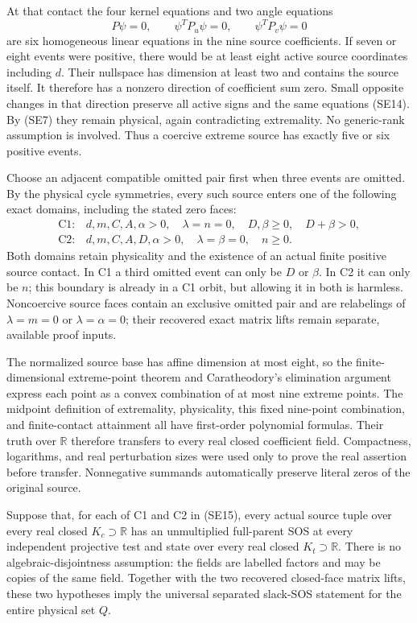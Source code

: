 At that contact the four kernel equations and two angle equations
\[
P\psi=0,\qquad \psi^TP_u\psi=0,\qquad\psi^TP_v\psi=0
\tag{SE14}
\]
are six homogeneous linear equations in the nine source coefficients.
If seven or eight events were positive, there would be at least eight
active source coordinates including $d$.  Their nullspace has dimension
at least two and contains the source itself.  It therefore has a
nonzero direction of coefficient sum zero.  Small opposite changes in
that direction preserve all active signs and the same equations
(SE14).  By (SE7) they remain physical, again contradicting extremality.
No generic-rank assumption is involved.  Thus a coercive extreme source
has exactly five or six positive events.

Choose an adjacent compatible omitted pair first when three events are
omitted.  By the physical cycle symmetries, every such source enters
one of the following exact domains, including the stated zero faces:
\[
\begin{array}{ll}
\mathrm{C1}:&d,m,C,A,\alpha>0,\quad
 \lambda=n=0,\quad D,\beta\geq0,\quad D+\beta>0,\\
\mathrm{C2}:&d,m,C,A,D,\alpha>0,\quad
 \lambda=\beta=0,\quad n\geq0.
\end{array}
\tag{SE15}
\]
Both domains retain physicality and the existence of an actual finite
positive source contact.  In C1 a third omitted event can only be
$D$ or $\beta$.  In C2 it can only be $n$; this boundary is already
in a C1 orbit, but allowing it in both is harmless.  Noncoercive source
faces contain an exclusive omitted pair and are relabelings of
$\lambda=m=0$ or $\lambda=\alpha=0$; their recovered exact matrix
lifts remain separate, available proof inputs.

The normalized source base has affine dimension at most eight, so the
finite-dimensional extreme-point theorem and Caratheodory's elimination
argument express each point as a convex combination of at most nine
extreme points.  The midpoint definition of extremality, physicality,
this fixed nine-point combination, and finite-contact attainment all
have first-order polynomial formulas.  Their truth over $\mathbb R$
therefore transfers to every real closed coefficient field.  Compactness,
logarithms, and real perturbation sizes were used only to prove the real
assertion before transfer.  Nonnegative summands automatically preserve
literal zeros of the original source.

\begin{corollary}
Suppose that, for each of C1 and C2 in (SE15), every actual source
tuple over every real closed $K_c\supset\mathbb R$ has an
unmultiplied full-parent SOS at every independent projective test and
state over every real closed $K_t\supset\mathbb R$.  There is no
algebraic-disjointness assumption: the fields are labelled factors and
may be copies of the same field.  Together with the two recovered
closed-face matrix lifts, these two hypotheses imply the universal
separated slack-SOS statement for the entire physical set $Q$.
\end{corollary}

